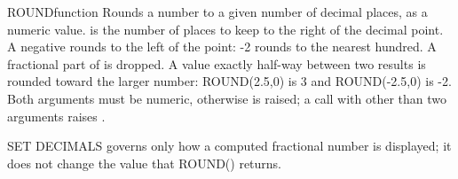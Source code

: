 \begin{XbaseEntry}{ROUND}{function}
Rounds a number to a given number of decimal places, as a numeric value.
\Syntax
{}
\Usage
{} is the number of places to keep to the right of the decimal point. A negative  rounds to the left of the point: -2 rounds to the nearest hundred. A fractional part of  is dropped. A value exactly half-way between two results is rounded toward the larger number: ROUND(2.5,0) is 3 and ROUND(-2.5,0) is -2. Both arguments must be numeric, otherwise  is raised; a call with other than two arguments raises .

SET DECIMALS governs only how a computed fractional number is displayed; it does not change the value that ROUND() returns.
\Examples
{}
\end{XbaseEntry}


